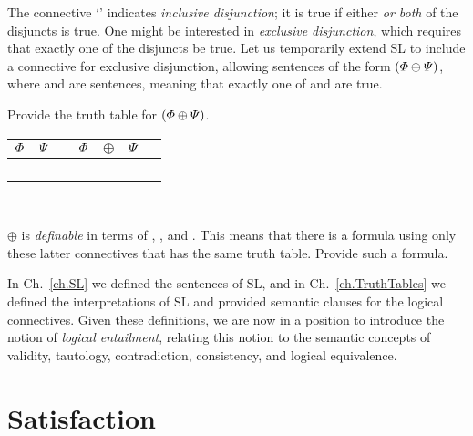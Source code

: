 The connective `\eor' indicates \emph{inclusive disjunction}; it is true if either \emph{or both} of the disjuncts is true. One might be interested in \emph{exclusive disjunction}, which requires that exactly one of the disjuncts be true. Let us temporarily extend SL to include a connective for exclusive disjunction, allowing sentences of the form $(\varPhi{} \oplus \varPsi{})$, where \metaA{} and \metaB{} are sentences, meaning that exactly one of \metaA{} and \metaB{} are true.
\begin{earg}
  \item Provide the truth table for $(\varPhi{} \oplus \varPsi{})$.

  \begin{tabular}{@{ }c@{ }@{ }c | c@{ }@{ }c@{ }@{ }c@{ }@{ }c@{ }@{ }c}
    $\varPhi{}$ & $\varPsi{}$ &  & $\varPhi{}$ & $\oplus$ & $\varPsi{}$ & \\
    \hline 
     &  &  &  &  & & \\
     &  &  &  &  &  & \\
     &  &  &  &  &  & \\
     &  &  &  &  &  & \\
  \end{tabular}\\

  \item $\oplus$ is \emph{definable} in terms of \eor, \eand, and \enot. This means that there is a formula using only these latter connectives that has the same truth table. Provide such a formula.
\end{earg}


\fi





In Ch.~\ref{ch.SL} we defined the sentences of SL, and in Ch.~\ref{ch.TruthTables} we defined the interpretations of SL and provided semantic clauses for the logical connectives.
Given these definitions, we are now in a position to introduce the notion of \textit{logical entailment}, relating this notion to the semantic concepts of validity, tautology, contradiction, consistency, and logical equivalence.






\section{Satisfaction}
\label{sec:satisfaction}

